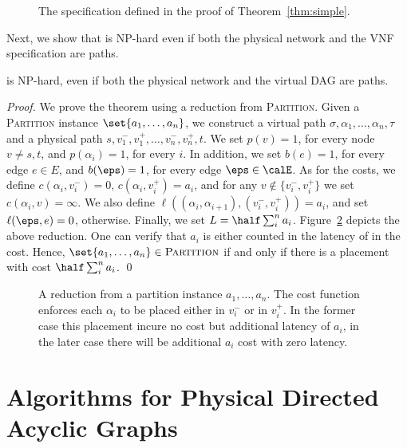 \begin{figure}[t]
  \centering
{}
\caption{The specification defined in the proof of Theorem~\ref{thm:simple}.}
\label{fig:simple}
\end{figure}

Next, we show that \scp is NP-hard even if both the physical network
and the VNF specification are paths.

\begin{theorem}
\scp is NP-hard, even if both the physical network and the virtual DAG
are paths.
\end{theorem}
\begin{proof}
We prove the theorem using a reduction from \textsc{Partition}.  Given
a \textsc{Partition} instance $\set{a_1, \ldots, a_n}$, we construct a
virtual path $\sigma, \alpha_1, \ldots, \alpha_n, \tau$ and a physical
path $s, v_1^-, v_1^+, \ldots, v_n^-, v_n^+, t$.  We set $p(v) = 1$,
for every node $v \neq s,t$, and $p(\alpha_i) = 1$, for every $i$.  In
addition, we set $b(e) = 1$, for every edge $e \in E$, and $b(\eps) =
1$, for every edge $\eps \in \calE$.
%
As for the costs, we define $c(\alpha_i, v_i^-) = 0$, $c(\alpha_i,
v_i^+) = a_i$, and for any $v \notin \{v_i^-,v_i^+\}$ we set
$c(\alpha_i, v) = \infty$.  We also define $\ell((\alpha_i,\alpha_{i+1}),
(v_i^-,v_i^+)) = a_i$, and set $\ell(\eps,e) = 0$, otherwise.  Finally,
we set $L = \half \sum_i^n a_i$.
%
Figure~\ref{fig:reduction2} depicts the above reduction.
%
One can verify that $a_i$ is either counted in the latency of in the
cost.  Hence, $\set{a_1, \ldots, a_n} \in \textsc{Partition}$ if and
only if there is a placement with cost $\half \sum_i^n a_i$.
%
\qed
\end{proof}


\begin{figure}[t]
\centering
{}
\caption{A reduction from a partition instance $a_1, \ldots, a_n$.
  The cost function enforces each $\alpha_i$ to be placed either in
  $v_i^-$ or in $v_i^+$.  In the former case this placement incure no
  cost but additional latency of $a_i$, in the later case there will
  be additional $a_i$ cost with zero latency.}
\label{fig:reduction2}
\end{figure}



\section{Algorithms for Physical Directed Acyclic Graphs}
\label{sec:algorithms}

